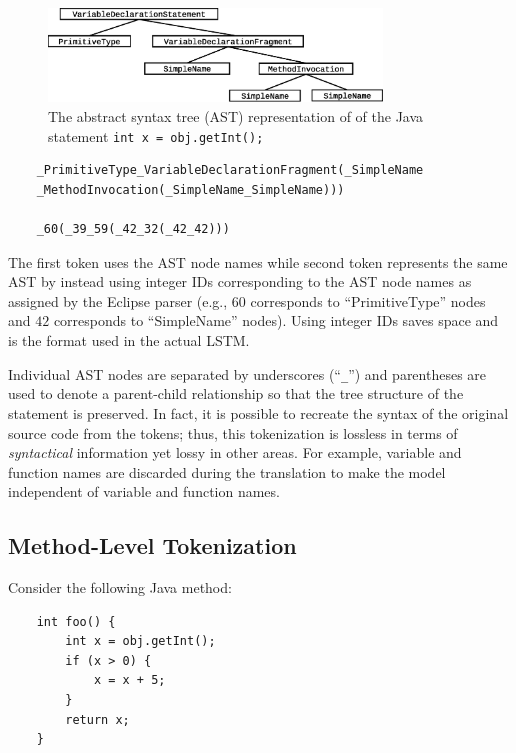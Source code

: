 \documentclass[runningheads,a4paper]{llncs}
\begin{document}
\begin{figure}
\begin{center}
\centerline{\includegraphics[height=25mm]{ast.eps}}
\caption{The abstract syntax tree (AST) representation of of the Java statement
\texttt{int x = obj.getInt();}}
\label{ast-figure}
\end{center}
\vskip -7mm
\end{figure} 


\begin{verbatim}
    _PrimitiveType_VariableDeclarationFragment(_SimpleName
    _MethodInvocation(_SimpleName_SimpleName))) 
    
    _60(_39_59(_42_32(_42_42)))
\end{verbatim}

The first token uses the AST node names while second token
represents the same AST by instead using
integer IDs corresponding to the AST node names as assigned by
the Eclipse parser
(e.g., $60$ corresponds to ``PrimitiveType'' nodes and $42$ corresponds to
``SimpleName'' nodes). Using integer IDs saves space and is the format
used in the actual LSTM.

Individual AST nodes
are separated by underscores (``\texttt{\_}'') and parentheses are used
to denote a parent-child relationship so that the tree structure of
the statement is preserved. In fact, it is possible  to recreate the
syntax of the original source  code from the tokens; thus, this 
tokenization is lossless in terms of  \textit{syntactical} information 
yet lossy in other areas. For example, variable and function names are
discarded during the translation to make the model independent of
variable and function names.

\subsection{Method-Level Tokenization}

Consider the following Java method:

\begin{verbatim}
    int foo() {
        int x = obj.getInt();
        if (x > 0) {
            x = x + 5;
        }
        return x;
    }
\end{verbatim}
\end{document}
